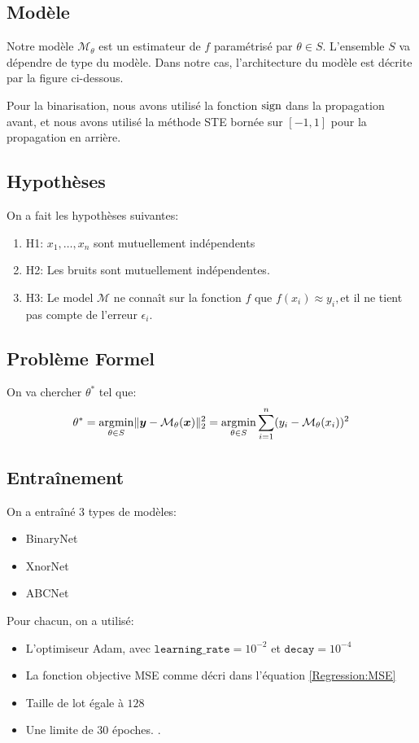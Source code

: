 \subsection{Modèle}
Notre modèle $\mathcal{M}_\theta$ est un estimateur de $f$ paramétrisé par $\theta\in S$. L'ensemble $S$ va dépendre de type du modèle.
\newline
Dans notre cas, l'architecture du modèle est décrite par la figure ci-dessous.

Pour la binarisation, nous avons utilisé la fonction $\operatorname{sign}$ dans la propagation avant, et nous avons utilisé la méthode STE bornée sur $[-1,1]$ pour la propagation en arrière.

\subsection{Hypothèses}
On a fait les hypothèses suivantes:
\begin{enumerate}
	\item H1: $x_1,\dots,x_n$ sont mutuellement indépendents
	\item H2: Les bruits sont mutuellement indépendentes.
	\item H3: Le model $\mathcal{M}$ ne connaît sur la fonction $f$ que $f(x_i)\approx y_i,$et il ne tient pas compte de l'erreur $\epsilon_i.$
\end{enumerate}
\subsection{Problème Formel}
On va chercher $\theta^*$ tel que:
\begin{equation}\label{Regression:MSE}
	\theta^* = \operatorname*{\arg\!\min}_{\theta \in S } \lVert\boldsymbol{y}-\mathcal{M}_\theta(\boldsymbol{x})\rVert_2^2 =\operatorname*{\arg\!\min}_{\theta \in S }\sum_{i=1}^n(y_i-\mathcal{M}_\theta(x_i))^2
\end{equation}

\subsection{Entraînement}
On a entraîné 3 types de modèles:
\begin{itemize}
	\item BinaryNet
	\item XnorNet
	\item ABCNet
\end{itemize}
Pour chacun, on a utilisé:
\begin{itemize}
	\item L'optimiseur Adam, avec $\mathtt{learning\_rate}=10^{-2}$ et $\mathtt{decay}=10^{-4}$
	\item La fonction objective MSE comme décri dans l'équation \eqref{Regression:MSE}
	\item Taille de lot égale à $128$
	\item Une limite de $30$ époches.
	.
\end{itemize}
